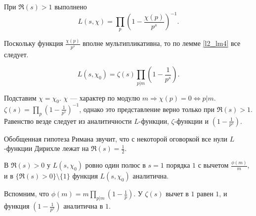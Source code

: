 \begin{lemma} \label{l7_Euler_ident}
	При $\Re(s) > 1$ выполнено
	$$L(s, \chi) = \prod_{p} \left(1 - \frac{\chi(p)}{p^s} \right)^{-1}.$$
\end{lemma}
\begin{pf}
	Поскольку функция $\displaystyle \frac{\chi(p)}{p^s}$ вполне мультипликативна, то по лемме \ref{l2_lm4} все следует.
\end{pf}

\begin{corollary} \label{l7_cor1}
	$$L(s, \chi_0) = \zeta(s) \prod_{p | m} \left( 1 - \frac{1}{p^s} \right).$$
\end{corollary}
\begin{pf}	
	Подставим $\chi = \chi_0$. $\chi$ — характер по модулю $m \Rightarrow \chi(p) = 0 \Leftrightarrow p | m$.
	$\displaystyle \zeta(s) = \prod_p  \left( 1 - \frac{1}{p^s} \right)^{-1}$, однако это представление верно только при
	$\Re(s) > 1$. Равенство везде следует из аналитичности $L$-функции, $\zeta$-функции и $\displaystyle \left(1 - \frac{1}{p^s} \right)$.
\end{pf}

\begin{note}
	Обобщенная гипотеза Римана звучит, что с некоторой оговоркой все нули $L$-функции Дирихле лежат на
	$\displaystyle \Re(s) = \frac{1}{2}$.
\end{note}

\begin{corollary} \label{l7_col2}
	В $\Re(s) > 0$ у $L(s, \chi_0)$ ровно один полюс в $s = 1$ порядка $1$ с вычетом $\displaystyle \frac{\phi(m)}{m}$, и в $\lbrace \Re(s) > 0 \rbrace \setminus \lbrace{1\rbrace}$ функция $L(s, \chi_0)$ аналитична.
\end{corollary}
\begin{pf}
	Вспомним, что $\displaystyle \phi(m) = m \prod_{p | m} \left( 1 - \frac{1}{p} \right)$. У $\zeta(s)$ вычет в $1$ равен $1$, и функция $\displaystyle \left(1 - \frac{1}{p^s} \right)$ аналитична в $1$.
\end{pf}

